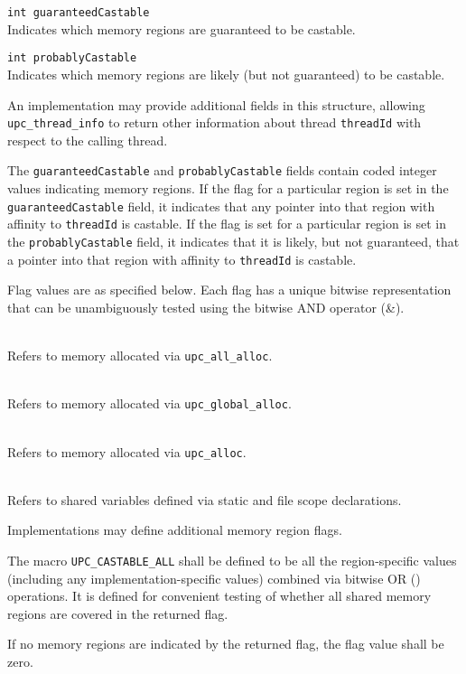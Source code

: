 \begin{description}
\item{\tt int guaranteedCastable} \hfill \\
Indicates which memory regions are guaranteed to be castable.
\item{\tt int probablyCastable} \hfill \\
Indicates which memory regions are likely (but not guaranteed)
to be castable.
\end{description}

\np An implementation may provide additional fields in this structure,
allowing {\tt upc\_thread\_info} to return other information about
thread {\tt threadId} with respect to the calling thread.

\np The {\tt guaranteedCastable} and {\tt probablyCastable} fields
contain coded integer values indicating memory regions.  If the flag
for a particular region is set in the {\tt guaranteedCastable} field,
it indicates that
any pointer into that region with affinity to {\tt threadId} is
castable.  If the flag is
set for a particular region is set in the {\tt probablyCastable} field,
it indicates that it is likely, but not guaranteed, that a pointer into
that region with affinity to {\tt threadId} is castable.

\np Flag values are as specified below.  Each flag has a
unique bitwise representation that can be unambiguously tested using the
bitwise AND operator (\&).

\begin{description}
\item[{\tt UPC\_CASTABLE\_ALL\_ALLOC}] \hfill \\
Refers to memory allocated via {\tt upc\_all\_alloc}.
\item[{\tt UPC\_CASTABLE\_GLOBAL\_ALLOC}] \hfill \\
Refers to memory allocated via {\tt upc\_global\_alloc}.
\item[{\tt UPC\_CASTABLE\_ALLOC}] \hfill \\
Refers to memory allocated via {\tt upc\_alloc}.
\item[{\tt UPC\_CASTABLE\_STATIC}] \hfill \\
Refers to shared variables defined via static and file scope declarations.
\end{description}

\np Implementations may define additional memory region flags.

\np The macro {\tt UPC\_CASTABLE\_ALL} shall
be defined to be all the region-specific values (including any
implementation-specific values) combined via bitwise
OR ({\textbar}) operations.  It is defined for convenient testing of
whether all shared memory regions are covered in the returned flag.

\np If no memory regions are indicated by the returned flag, the flag
value shall be zero.


